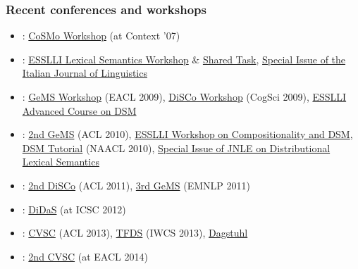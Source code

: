 \documentclass[t]{beamer} %
\begin{document}
\begin{frame}
  \frametitle{Recent conferences and workshops}

  \ungap[1]
  \begin{itemize}
  \item {}: \href{http://clic.cimec.unitn.it/marco/beyond_words/}{CoSMo Workshop} (at Context '07)
  \item {}: \href{http://wordspace.collocations.de/doku.php/workshop:esslli:start}{ESSLLI Lexical Semantics Workshop} \& \href{http://wordspace.collocations.de/doku.php/workshop:esslli:task}{Shared Task}, \href{http://linguistica.sns.it/RdL/2008.html}{Special Issue of the Italian Journal of Linguistics}
  \item {}: \href{http://art.uniroma2.it/gems/}{GeMS Workshop} (EACL 2009), \href{http://www.let.rug.nl/disco2009/}{DiSCo Workshop} (CogSci 2009), \href{http://wordspace.collocations.de/doku.php/course:esslli2009:start}{ESSLLI Advanced Course on DSM}
  \item {}: \href{http://art.uniroma2.it/gems010/}{2nd GeMS} (ACL 2010), \href{http://clic.cimec.unitn.it/roberto/ESSLLI10-dsm-workshop/}{ESSLLI Workshop on Compositionality and DSM}, \href{http://naaclhlt2010.isi.edu/tutorials/t4.html}{DSM Tutorial} (NAACL 2010), \href{http://journals.cambridge.org/action/displayIssue?iid=7911772}{Special Issue of JNLE on Distributional Lexical Semantics}
  \item {}: \href{http://disco2011.fzi.de}{2nd DiSCo} (ACL 2011), \href{https://sites.google.com/site/geometricalmodels/}{3rd GeMS} (EMNLP 2011)
  \item {}: \href{http://didas.org}{DiDaS} (at ICSC 2012)
  \item {}: \href{https://sites.google.com/site/cvscworkshop/}{CVSC} (ACL 2013), \href{http://clic.cimec.unitn.it/roberto/IWCS-TFDS2013/}{TFDS} (IWCS 2013), \href{http://www.dagstuhl.de/en/program/calendar/semhp/?semnr=13462}{Dagstuhl}
  \item {}: \href{https://sites.google.com/site/cvscworkshop2014/}{2nd CVSC} (at EACL 2014)
  \end{itemize}
  \hfill{}
\end{frame}
\end{document}
